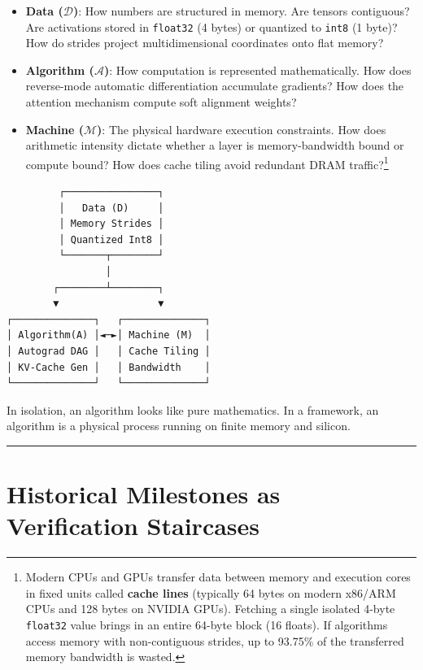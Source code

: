 \documentclass[
  letterpaper,
]{scrbook}
\providecommand{\tightlist}{%
  \setlength{\itemsep}{0pt}\setlength{\parskip}{0pt}}
\begin{document}
\begin{itemize}
\tightlist
\item
  \textbf{Data (\(\mathcal{D}\))}: How numbers are structured in memory.
  Are tensors contiguous? Are activations stored in \texttt{float32} (4
  bytes) or quantized to \texttt{int8} (1 byte)? How do strides project
  multidimensional coordinates onto flat memory?
\item
  \textbf{Algorithm (\(\mathcal{A}\))}: How computation is represented
  mathematically. How does reverse-mode automatic differentiation
  accumulate gradients? How does the attention mechanism compute soft
  alignment weights?
\item
  \textbf{Machine (\(\mathcal{M}\))}: The physical hardware execution
  constraints. How does arithmetic intensity dictate whether a layer is
  memory-bandwidth bound or compute bound? How does cache tiling avoid
  redundant DRAM traffic?\footnote{Modern CPUs and GPUs transfer data
    between memory and execution cores in fixed units called
    \textbf{cache lines} (typically 64 bytes on modern x86/ARM CPUs and
    128 bytes on NVIDIA GPUs). Fetching a single isolated 4-byte
    \texttt{float32} value brings in an entire 64-byte block (16
    floats). If algorithms access memory with non-contiguous strides, up
    to 93.75\% of the transferred memory bandwidth is wasted.}
\end{itemize}

\begin{verbatim}
         ┌────────────────┐
         │   Data (D)     │
         │ Memory Strides │
         │ Quantized Int8 │
         └───────┬────────┘
                 │
        ┌────────┴────────┐
        ▼                 ▼
┌──────────────┐   ┌──────────────┐
│ Algorithm(A) │◄─►│ Machine (M)  │
│ Autograd DAG │   │ Cache Tiling │
│ KV-Cache Gen │   │ Bandwidth    │
└──────────────┘   └──────────────┘
\end{verbatim}

In isolation, an algorithm looks like pure mathematics. In a framework,
an algorithm is a physical process running on finite memory and silicon.

\begin{center}\rule{0.5\linewidth}{0.5pt}\end{center}

\section*{Historical Milestones as Verification
Staircases}\label{historical-milestones-as-verification-staircases}
\end{document}

